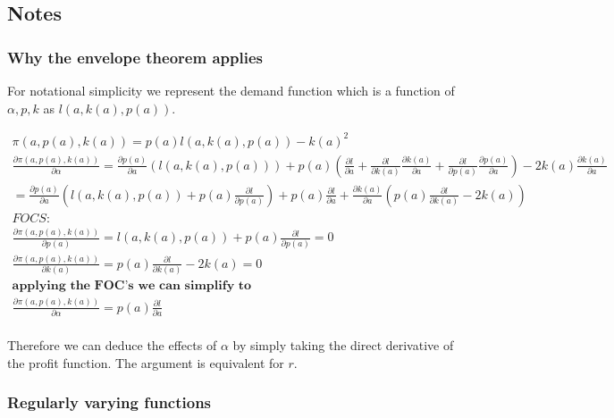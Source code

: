 \subsection{Notes} \label{notes}

\subsubsection{Why the envelope theorem applies} \label{envelopetheorem}


For notational simplicity we represent the demand function which is a function of $\alpha, p, k$ as $l(a, k(a),p(a))$.  

\begin{align*}
\pi(a, p(a),k(a))= p(a) l(a, k(a),p(a))-k(a)^2 \\
\frac{ \partial \pi(a, p(a),k(a))}{\partial \alpha}= \frac{\partial p(a) }{\partial a } \left(
l(a, k(a),p(a)) \right)
+ p(a)\left( \frac{\partial l}{\partial a}
+\frac{\partial l}{\partial k(a)}\frac{\partial k(a)}{\partial a}
+\frac{\partial l}{\partial p(a)}\frac{\partial p(a)}{\partial a}
\right)
- 2 k(a) \frac{\partial k(a)}{\partial a}
\\ 
= \frac{\partial p(a) }{\partial a } \left(
l(a, k(a),p(a)) +p(a) \frac{\partial l}{\partial p(a)} \right)
+ p(a) \frac{\partial l}{\partial a}
+\frac{\partial k(a)}{\partial a}\left( p(a)\frac{\partial l}{\partial k(a)}-2 k(a)
 \right) \\
FOCS: 
\\
\frac{\partial \pi(a, p(a),k(a))}{\partial p(a)}=l(a, k(a),p(a))+p(a) \frac{\partial l}{\partial p(a)}=0 
\\
\frac{\partial \pi(a, p(a),k(a))}{\partial k(a)}=p(a) \frac{\partial l}{\partial k(a)} -2 k(a)=0
\\
\textbf{applying the FOC's we can simplify to}
\\
\frac{ \partial \pi(a, p(a),k(a))}{\partial \alpha}= 
p(a) \frac{\partial l}{\partial a} \\
\end{align*}

Therefore we can deduce the effects of $\alpha$ by simply taking the direct derivative of the profit function. The argument is equivalent for $r$.

\subsubsection{Regularly varying functions}

